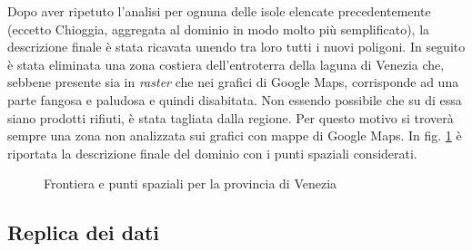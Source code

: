 \documentclass[a4paper,11pt,twoside,openright]{book}							%
\begin{document}
Dopo aver ripetuto l'analisi per ognuna delle isole elencate precedentemente (eccetto Chioggia, aggregata al dominio in modo molto più semplificato), la descrizione finale è stata ricavata unendo tra loro tutti i nuovi poligoni. In seguito è stata eliminata una zona costiera dell'entroterra della laguna di Venezia che, sebbene presente sia in \textit{raster} che nei grafici di Google Maps, corrisponde ad una parte fangosa e paludosa e quindi disabitata. Non essendo possibile che su di essa siano prodotti rifiuti, è stata tagliata dalla regione. Per questo motivo si troverà sempre una zona non analizzata sui grafici con mappe di Google Maps. In fig. \ref{fig:Ven_rgm} è riportata la descrizione finale del dominio con i punti spaziali considerati.
\begin{figure}[t]
	\centering
	\caption{Frontiera e punti spaziali per la provincia di Venezia}
	\label{fig:Ven_rgm}
\end{figure}

\subsection{Replica dei dati}
\label{sez:comunireplicati}
\end{document}
